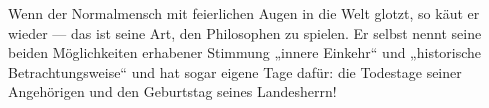 Wenn der Normalmensch mit feierlichen Augen in die Welt glotzt, so käut er wieder — das ist seine Art, den Philosophen zu spielen. Er selbst nennt seine beiden Möglichkeiten erhabener Stimmung „innere Einkehr“ und „historische Betrachtungsweise“ und hat sogar eigene Tage dafür: die Todestage seiner Angehörigen und den Geburtstag seines Landesherrn!
\par

